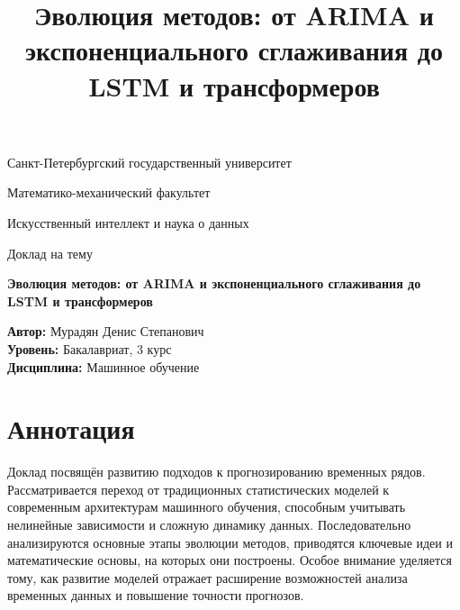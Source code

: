 \documentclass[12pt,a4paper]{article}
\title{\textbf{Эволюция методов: от ARIMA и экспоненциального сглаживания до LSTM и трансформеров}}
\date{\the\year}
\begin{document}
\begin{titlepage}
    \centering
    \vspace*{1cm}
    {\large Санкт-Петербургский государственный университет\par}
    {\large Математико-механический факультет\par}
    {\large Искусственный интеллект и наука о данных\par}
    \vfill
    {\Large Доклад на тему}\par
    \vspace{0.8cm}
    {\LARGE \textbf{Эволюция методов: от ARIMA и экспоненциального сглаживания до LSTM и трансформеров}}\par
    \vfill
    \begin{flushleft}
        \textbf{Автор:} Мурадян Денис Степанович\\[2pt]
        \textbf{Уровень:} Бакалавриат, 3 курс\\[2pt]
        \textbf{Дисциплина:} Машинное обучение\\[2pt]
    \end{flushleft}
    \vspace{0.8cm}
    {\large \the\year\par}
\end{titlepage}

\section{Аннотация}

Доклад посвящён развитию подходов к прогнозированию временных рядов. Рассматривается переход от традиционных статистических моделей к современным архитектурам машинного обучения, способным учитывать нелинейные зависимости и сложную динамику данных. Последовательно анализируются основные этапы эволюции методов, приводятся ключевые идеи и математические основы, на которых они построены. Особое внимание уделяется тому, как развитие моделей отражает расширение возможностей анализа временных данных и повышение точности прогнозов.

\medskip
\end{document}
